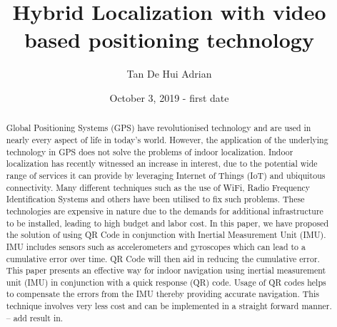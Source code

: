 \documentclass{l4proj}
\begin{document}
\title{Hybrid Localization with video based positioning technology}
\author{Tan De Hui Adrian}
\date{October 3, 2019 - first date}

\maketitle

\begin{abstract}
     Global Positioning Systems (GPS) have revolutionised technology and are used in nearly every aspect of life in today's world. However, the application of the 		underlying technology in GPS does not solve the problems of indoor localization. Indoor localization has recently witnessed an increase in interest, due to the potential wide range of services it can provide by leveraging Internet of Things (IoT) and ubiquitous connectivity. Many different techniques such as the use of WiFi, Radio Frequency Identification Systems and others have been utilised to fix such problems. These technologies are expensive in nature due to the demands for additional infrastructure to be installed, leading to high budget and labor cost. In this paper, we have proposed the solution of using QR Code in conjunction with Inertial Measurement Unit (IMU). IMU includes sensors such as accelerometers and gyroscopes which can lead to a cumulative error over time. QR Code will then aid in reducing the cumulative error. This paper presents an effective way for indoor navigation using inertial measurement unit (IMU) in conjunction with a quick response (QR) code. Usage of QR codes helps to compensate the errors from the IMU thereby providing accurate navigation. This technique involves very less cost and can be implemented in a straight forward manner.  -- add result in.
\end{abstract}


%
%
%
\educationalconsent
\end{document}
